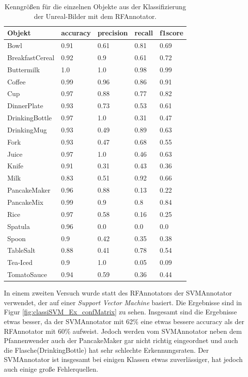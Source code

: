 \begin{table}
\begin{tabularx}{\textwidth}{Xllll}
\textbf{Objekt}	& \textbf{\gls{accuracy}} & \textbf{\gls{precision}}	& \textbf{\gls{recall}}	& \textbf{\gls{f1score}} \\ \hline
Bowl & 0.91 & 0.61 & 0.81 & 0.69 \\  
BreakfastCereal & 0.92 & 0.9 & 0.61 & 0.72 \\  
Buttermilk & 1.0 & 1.0 & 0.98 & 0.99 \\  
Coffee & 0.99 & 0.96 & 0.86 & 0.91 \\  
Cup & 0.97 & 0.88 & 0.77 & 0.82 \\  
DinnerPlate & 0.93 & 0.73 & 0.53 & 0.61 \\  
DrinkingBottle & 0.97 & 1.0 & 0.31 & 0.47 \\  
DrinkingMug & 0.93 & 0.49 & 0.89 & 0.63 \\  
Fork & 0.93 & 0.47 & 0.68 & 0.55 \\  
Juice & 0.97 & 1.0 & 0.46 & 0.63 \\  
Knife & 0.91 & 0.31 & 0.43 & 0.36 \\  
Milk & 0.83 & 0.51 & 0.92 & 0.66 \\  
PancakeMaker & 0.96 & 0.88 & 0.13 & 0.22 \\  
PancakeMix & 0.99 & 0.9 & 0.8 & 0.84 \\  
Rice & 0.97 & 0.58 & 0.16 & 0.25 \\  
Spatula & 0.96 & 0.0 & 0.0 & 0.0 \\  
Spoon & 0.9 & 0.42 & 0.35 & 0.38 \\  
TableSalt & 0.88 & 0.41 & 0.78 & 0.54 \\  
Tea-Iced & 0.9 & 1.0 & 0.05 & 0.09 \\  
TomatoSauce & 0.94 & 0.59 & 0.36 & 0.44 \\  
\end{tabularx}
\caption[Objekt spezifische Kenngrößen des RFAnnotators]{Kenngrößen für die einzelnen Objekte aus der Klassifizierung der Unreal-Bilder mit dem RFAnnotator.}
\label{tab:classiRF_Ex_classMetrics}
\end{table}

In einem zweiten Versuch wurde statt des RFAnnotators der SVMAnnotator verwendet, der auf einer \textit{Support Vector Machine} basiert. Die Ergebnisse sind in Figur  \ref{fig:classiSVM_Ex_confMatrix} zu sehen. Insgesamt sind die Ergebnisse etwas besser, da der SVMAnnotator mit 62\% eine etwas bessere \gls{accuracy} als der RFAnnotator mit 60\% aufweist. Jedoch werden vom SVMAnnotator neben dem Pfannenwender auch der PancakeMaker gar nicht richtig eingeordnet und auch die Flasche(DrinkingBottle) hat sehr schlechte Erkennungsraten. Der SVMAnnotator ist insgesamt bei einigen Klassen etwas zuverlässiger, hat jedoch auch einige große Fehlerquellen. 

